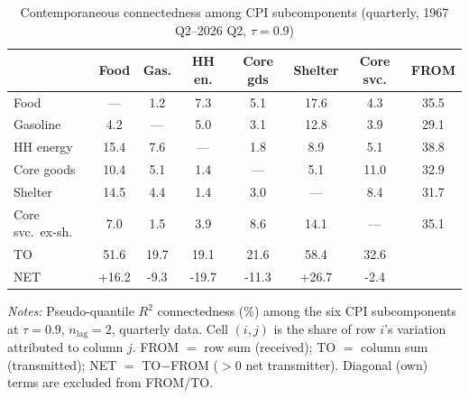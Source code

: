 \begin{table}[!ht]
\centering
\caption{Contemporaneous connectedness among CPI subcomponents (quarterly, 1967 Q2--2026 Q2, $\tau=0.9$)}
\label{tab:conncfullq}
\setlength{\tabcolsep}{4pt}\footnotesize
\begin{threeparttable}
\begin{tabular}{l c c c c c c c}
\toprule
 & Food & Gas. & HH en. & Core gds & Shelter & Core svc. & FROM \\
\midrule
Food & --- & 1.2 & 7.3 & 5.1 & 17.6 & 4.3 & 35.5 \\
Gasoline & 4.2 & --- & 5.0 & 3.1 & 12.8 & 3.9 & 29.1 \\
HH energy & 15.4 & 7.6 & --- & 1.8 & 8.9 & 5.1 & 38.8 \\
Core goods & 10.4 & 5.1 & 1.4 & --- & 5.1 & 11.0 & 32.9 \\
Shelter & 14.5 & 4.4 & 1.4 & 3.0 & --- & 8.4 & 31.7 \\
Core svc.\ ex-sh. & 7.0 & 1.5 & 3.9 & 8.6 & 14.1 & --- & 35.1 \\
\midrule
TO & 51.6 & 19.7 & 19.1 & 21.6 & 58.4 & 32.6 &  \\
NET & +16.2 & -9.3 & -19.7 & -11.3 & +26.7 & -2.4 &  \\
\bottomrule
\end{tabular}
\begin{tablenotes}[flushleft]\footnotesize
\item \textit{Notes:} Pseudo-quantile $R^2$ connectedness (\%) among the six CPI subcomponents at $\tau=0.9$, $n_{\text{lag}}=2$, quarterly data. Cell $(i,j)$ is the share of row $i$'s variation attributed to column $j$. FROM $=$ row sum (received); TO $=$ column sum (transmitted); NET $=$ TO$-$FROM ($>0$ net transmitter). Diagonal (own) terms are excluded from FROM/TO.
\end{tablenotes}
\end{threeparttable}
\end{table}


